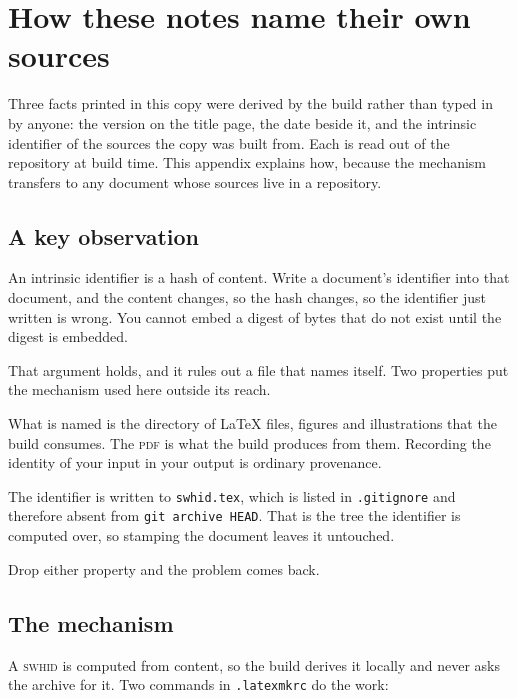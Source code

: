 \chapter{How these notes name their own sources}
\label{app:self}

Three facts printed in this copy were derived by the build rather than typed in by anyone: the
version on the title page, the date beside it, and the intrinsic identifier of the sources the
copy was built from. Each is read out of the repository at build time. This appendix explains
how, because the mechanism transfers to any document whose sources live in a repository.

\section{A key observation}

An intrinsic identifier is a hash of content. Write a document's identifier into that document,
and the content changes, so the hash changes, so the identifier just written is wrong. You cannot
embed a digest of bytes that do not exist until the digest is embedded.

That argument holds, and it rules out a file that names itself. Two properties put the mechanism
used here outside its reach.

\begin{description}[leftmargin=1.6em,itemsep=3pt]
\item[The identifier names the sources.] What is named is the directory of \LaTeX{} files,
  figures and illustrations that the build consumes. The \textsc{pdf} is what the build produces
  from them. Recording the identity of your input in your output is ordinary provenance.
\item[The stamp stays out of the sources.] The identifier is written to \texttt{swhid.tex}, which
  is listed in \texttt{.gitignore} and therefore absent from \texttt{git archive HEAD}. That is
  the tree the identifier is computed over, so stamping the document leaves it untouched.
\end{description}

\noindent Drop either property and the problem comes back.

\section{The mechanism}

A \textsc{swhid} is computed from content, so the build derives it locally and never asks the
archive for it. Two commands in \texttt{.latexmkrc} do the work:

